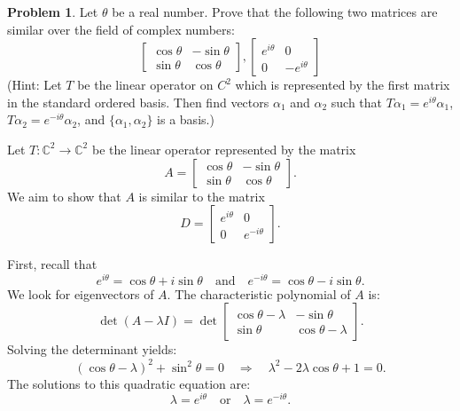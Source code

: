 \documentclass[12pt]{article}
\theoremstyle{definition}
\newtheorem{problem}{Problem}
\begin{document}
\begin{problem}
    Let $\theta$ be a real number. Prove that the following two matrices are similar over the field of complex numbers:
    \begin{equation*}
        \begin{bmatrix}
        \cos{\theta} & -\sin{\theta}\\
        \sin{\theta} & \cos{\theta}
        \end{bmatrix},
        \begin{bmatrix}
            e^{i\theta} & 0\\
            0 & -e^{i\theta}
        \end{bmatrix}
    \end{equation*}
    (Hint: Let $T$ be the linear operator on $C^2$ which is represented by the first matrix in the standard ordered basis.
    Then find vectors $\alpha_1$ and $\alpha_2$ such that $T\alpha_1 = e^{i\theta}\alpha_1$, $T\alpha_2 = e^{-i\theta}\alpha_2$,
    and $\{\alpha_1, \alpha_2\}$ is a basis.)
    \begin{solution}

        Let $T: \mathbb{C}^2 \to \mathbb{C}^2$ be the linear operator represented by the matrix
        \[
        A = \begin{bmatrix} \cos{\theta} & -\sin{\theta} \\ \sin{\theta} & \cos{\theta} \end{bmatrix}.
        \]
        We aim to show that \(A\) is similar to the matrix 
        \[
        D = \begin{bmatrix} e^{i\theta} & 0 \\ 0 & e^{-i\theta} \end{bmatrix}.
        \]

        First, recall that
        \[
        e^{i\theta} = \cos{\theta} + i\sin{\theta} \quad \text{and} \quad e^{-i\theta} = \cos{\theta} - i\sin{\theta}.
        \]
        We look for eigenvectors of \(A\). The characteristic polynomial of \(A\) is:
        \[
        \det\left( A - \lambda I \right) = \det \begin{bmatrix} \cos{\theta} - \lambda & -\sin{\theta} \\ \sin{\theta} & \cos{\theta} - \lambda \end{bmatrix}.
        \]
        Solving the determinant yields:
        \[
        (\cos{\theta} - \lambda)^2 + \sin^2{\theta} = 0 \quad \Rightarrow \quad \lambda^2 - 2\lambda\cos{\theta} + 1 = 0.
        \]
        The solutions to this quadratic equation are:
        \[
        \lambda = e^{i\theta} \quad \text{or} \quad \lambda = e^{-i\theta}.
        \]


\end{solution}
\end{problem}
\end{document}
